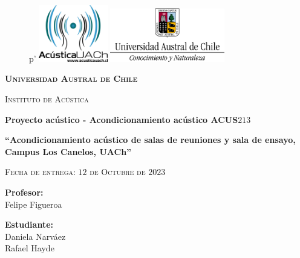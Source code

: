 \thispagestyle{empty}
			\begin{figure}[ht]
		   \minipage{\textwidth}p'
				\includegraphics[width=3cm]{Imagenes/acustica-color.png}
				\label{escudoTecNM}
		   \endminipage
		   \minipage{\textwidth}
				\includegraphics[width=5cm]{Imagenes/UACh_Marcacolor.png}
				\label{EscudoITCJ}
			\endminipage
		\end{figure}
		
		\vspace{0.1cm}
		
		\begin{center}
		    {\scshape\LARGE \textbf{Universidad Austral de Chile} \par}
			{\scshape\Large Instituto de Acústica \par}
            \vspace{0.3cm}
             {\Large \textbf{Proyecto acústico - Acondicionamiento acústico ACUS$213$}}

			\begin{center}
				
			{\LARGE\bfseries ``Acondicionamiento acústico de salas de reuniones y sala de ensayo, Campus Los Canelos, UACh'' \par}
            \vspace{0.75cm}
            
		{\scshape\Large Fecha de entrega: $12$ de Octubre de $2023$\par}	
        \vspace{0.75cm}
	    \LARGE	{ \textbf{Profesor:}}\\
        \large		{Felipe Figueroa}\\
        
		\vspace{0.5cm}	
		
		\LARGE	{ \textbf{Estudiante:}}\\
        \large	 {Daniela Narváez}\\
        \large   {Rafael Hayde}
    
        
        
        \normalsize	 {}

				\vspace{1.25cm}
				\vspace{0.9cm}
				
			\end{center}
	
		\end{center}